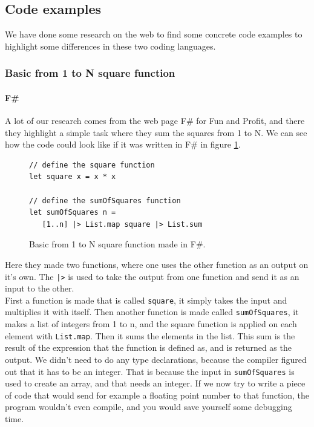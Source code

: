 \documentclass[12pt, a4paper]{article}
\newcommand{\code}[1]{{\small \texttt{#1}}}
\begin{document}
\subsection{Code examples}
We have done some research on the web to find some concrete code examples to highlight some differences in these two coding languages.

\subsubsection{Basic from 1 to N square function}
\paragraph{F\#}
A lot of our research comes from the web page F\# for Fun and Profit, and there they highlight a simple task where they sum the squares from 1 to N. We can see how the code could look like if it was written in F\# in figure \ref{fig:SquareFunctionFSharp}.

\begin{figure}[!h]
\begin{lstlisting}
// define the square function
let square x = x * x

// define the sumOfSquares function
let sumOfSquares n = 
   [1..n] |> List.map square |> List.sum
\end{lstlisting}
\caption{Basic from 1 to N square function made in F\#.}
\label{fig:SquareFunctionFSharp}
\end{figure}

Here they made two functions, where one uses the other function as an output on it's own. The \code{|>} is used to take the output from one function and send it as an input to the other.\\

First a function is made that is called \code{square}, it simply takes the input and multiplies it with itself. Then another function is made called \code{sumOfSquares}, it makes a list of integers from 1 to n, and the square function is applied on each element with \code{List.map}. Then it sums the elements in the list. This sum is the result of the expression that the function is defined as, and is returned as the output. We didn't need to do any type declarations, because the compiler figured out that it has to be an integer. That is because the input in \code{sumOfSquares} is used to create an array, and that needs an integer. If we now try to write a piece of code that would send for example a floating point number to that function, the program wouldn't even compile, and you would save yourself some debugging time.\\
\end{document}
